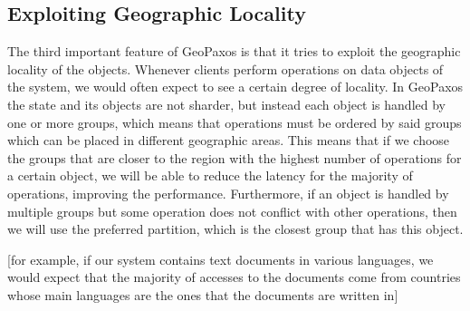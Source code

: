 \subsection{Exploiting Geographic Locality}
The third important feature of GeoPaxos is that it tries to exploit the geographic locality of the objects. Whenever clients perform operations on data objects of the system, we would often expect to see a certain degree of locality. In GeoPaxos the state and its objects are not sharder, but instead each object is handled by one or more groups, which means that operations must be ordered by said groups which can be placed in different geographic areas. This means that if we choose the groups that are closer to the region with the highest number of operations for a certain object, we will be able to reduce the latency for the majority of operations, improving the performance. Furthermore, if an object is handled by multiple groups but some operation does not conflict with other operations, then we will use the preferred partition, which is the closest group that has this object.

[for example, if our system contains text documents in various languages, we would expect that the majority of accesses to the documents come from countries whose main languages are the ones that the documents are written in]

